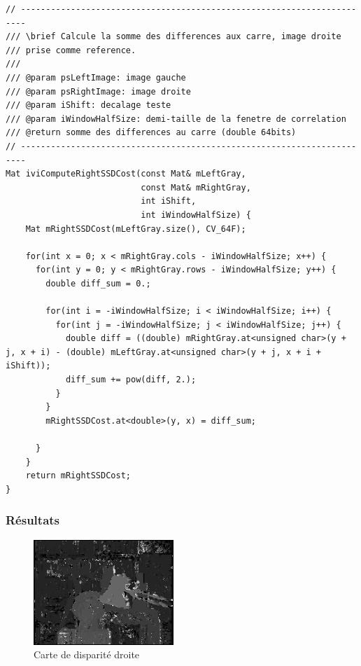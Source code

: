 \documentclass[a4paper]{article}
\begin{document}
\begin{lstlisting}
// -----------------------------------------------------------------------
/// \brief Calcule la somme des differences aux carre, image droite
/// prise comme reference.
///
/// @param psLeftImage: image gauche
/// @param psRightImage: image droite
/// @param iShift: decalage teste
/// @param iWindowHalfSize: demi-taille de la fenetre de correlation
/// @return somme des differences au carre (double 64bits)
// -----------------------------------------------------------------------
Mat iviComputeRightSSDCost(const Mat& mLeftGray,
                           const Mat& mRightGray,
                           int iShift,
                           int iWindowHalfSize) {
    Mat mRightSSDCost(mLeftGray.size(), CV_64F);

    for(int x = 0; x < mRightGray.cols - iWindowHalfSize; x++) {
      for(int y = 0; y < mRightGray.rows - iWindowHalfSize; y++) {
        double diff_sum = 0.;

        for(int i = -iWindowHalfSize; i < iWindowHalfSize; i++) {
          for(int j = -iWindowHalfSize; j < iWindowHalfSize; j++) {
            double diff = ((double) mRightGray.at<unsigned char>(y + j, x + i) - (double) mLeftGray.at<unsigned char>(y + j, x + i + iShift));
            diff_sum += pow(diff, 2.);
          }
        }
        mRightSSDCost.at<double>(y, x) = diff_sum;

      }
    }
    return mRightSSDCost;
}
\end{lstlisting}

\subsubsection{Résultats}

\begin{figure}[h]
\begin{center}
	\includegraphics[width=200px]{right-disparity_resampled.png}
\end{center}
\caption{Carte de disparité droite}
\end{figure}
\end{document}
